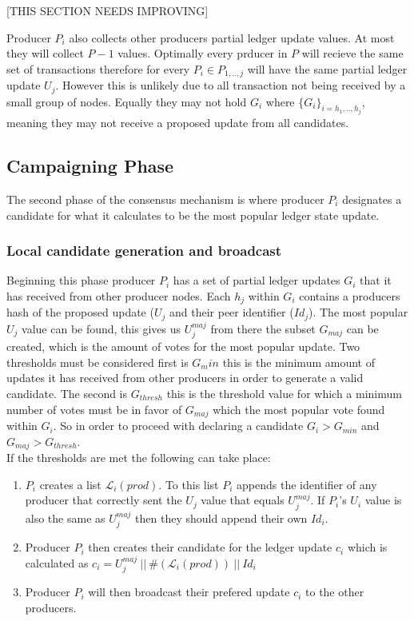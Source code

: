 \documentclass{article}
\begin{document}
[THIS SECTION NEEDS IMPROVING]

Producer $P_i$ also collects other producers partial ledger update values. At most they will collect $P-1$ values. Optimally every prducer in $P$ will recieve the same set of transactions therefore for every $P_i \in P_{1,..,j}$ will have the same partial ledger update $U_j$. However this is unlikely due to all transaction not being received by a small group of nodes. Equally they may not hold $G_i$ where  $\{G_i\}_{i=h_1,..,h_j}$, meaning they may not receive a proposed update from all candidates. 


\subsection{Campaigning Phase}

The second phase of the consensus mechanism is where producer $P_i$ designates a candidate for what it calculates to be the most popular ledger state update. \\

\subsubsection{Local candidate generation and broadcast}

Beginning this phase producer $P_i$ has a set of partial ledger updates $G_i$ that it has received from other producer nodes. Each $h_j$ within $G_i$ contains a producers hash of the proposed update ($U_j$ and their peer identifier ($Id_j$). The most popular $U_j$ value can be found, this gives us $U_j^{maj}$ from there the subset $G_{maj}$ can be created, which is the amount of votes for the most popular update. Two thresholds must be considered first is $G_min$ this is the minimum amount of updates it has received from other producers in order to generate a valid candidate. The second is $G_{thresh}$ this is the threshold value for which a minimum number of votes must be in favor of $G_{maj}$ which the most popular vote found within $G_i$.  So in order to proceed with declaring a candidate $G_i > G_{min}$ and $G_{maj} > G_{thresh}$. \\

If the thresholds are met the following can take place:

\begin{enumerate}
\item $P_i$ creates a list $\mathcal{L}_i(prod)$. To this list $P_i$ appends the identifier of any producer that correctly sent the $U_j$ value that equals $U_j^{maj}$. If $P_i$'s $U_i$ value is also the same as $U_j^{maj}$ then they should append their own $Id_i$.
\item Producer $P_i$ then creates their candidate for the ledger update $c_i$ which is calculated as $c_i = U_j^{maj}~||~\#(\mathcal{L}_i(prod))~||~Id_i$
\item Producer $P_i$ will then broadcast their prefered update $c_i$ to the other producers. 
\end{enumerate}
\end{document}
